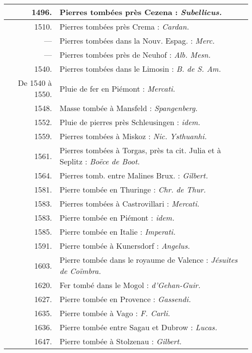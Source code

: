 \documentclass[a4paper, 12pt, oneside, french]{article}
\begin{document}
\begin{center}
\begin{longtable}{r p{85mm}}
        1496. & Pierres tombées près Cezena : \emph{Subellicus.}   \\ \hline
        1510. & Pierres tombées près Crema : \emph{Cardan.}   \\ \hline
        --- & Pierres tombées dans la Nouv. Espag. : \emph{Merc.}   \\ \hline
        --- & Pierres tombées près de Neuhof : \emph{Alb. Mesn.}   \\ \hline
        1540. & Pierres tombées dans le Limosin : \emph{B. de S. Am.}   \\ \hline
        De 1540 à 1550. & Pluie de fer en Piémont : \emph{Mercati.}   \\ \hline
        1548. & Masse tombée à Mansfeld : \emph{Spangenberg.}   \\ \hline
        1552. & Pluie de pierres près Schleusingen : \emph{idem.}   \\ \hline
        1559. & Pierres tombées à Miskoz : \emph{Nic. Ysthuanhi.}   \\ \hline
        1561. & Pierres tombées à Torgas, près ta cit. Julia et à Seplitz : \emph{Boëce de Boot.}   \\ \hline
        1564. & Pierres tomb. entre Malines Brux. : \emph{Gilbert.}   \\ \hline
        1581. & Pierre tombée en Thuringe : \emph{Chr. de Thur.}   \\ \hline
        1583. & Pierres tombées à Castrovillari : \emph{Mercati.}   \\ \hline
        1583. & Pierre tombée en Piémont : \emph{idem.}   \\ \hline
        1585. & Pierre tombée en Italie : \emph{Imperati.}   \\ \hline
        1591. & Pierre tombée à Kunersdorf : \emph{Angelus.}   \\ \hline
        1603. & Pierre tombée dans le royaume de Valence : \emph{Jésuites de Coïmbra.}   \\ \hline
        1620. & Fer tombé dans le Mogol : \emph{d'Gehan-Guir.}   \\ \hline
        1627. & Pierre tombée en Provence : \emph{Gassendi.}   \\ \hline
        1635. & Pierre tombée à Vago : \emph{F. Carli.}   \\ \hline
        1636. & Pierre tombée entre Sagau et Dubrow : \emph{Lucas.}   \\ \hline
        1647. & Pierre tombée à Stolzenau : \emph{Gilbert.}   \\ \hline

\end{longtable}
\end{center}
\end{document}
